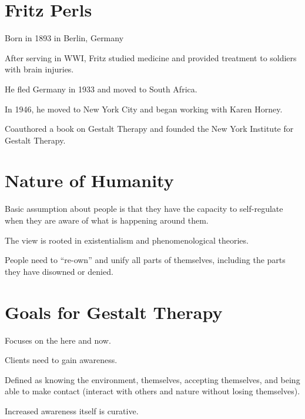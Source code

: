 \section{Fritz Perls}

\begin{coloredlist}
    \item Born in 1893 in Berlin, Germany
    \item After serving in WWI, Fritz studied medicine and provided treatment to soldiers with brain injuries.
    \item He fled Germany in 1933 and moved to South Africa.
    \item In 1946, he moved to New York City and began working with Karen Horney.
    \item Coauthored a book on Gestalt Therapy and founded the New York Institute for Gestalt Therapy.
\end{coloredlist}

\section{Nature of Humanity}

\begin{coloredlist}
    \item Basic assumption about people is that they have the capacity to self-regulate when they are aware of what is happening around them.
    \item The view is rooted in existentialism and phenomenological theories.
    \item People need to ``re-own'' and unify all parts of themselves, including the parts they have disowned or denied.
\end{coloredlist}

\section{Goals for Gestalt Therapy}

\begin{coloredlist}
    \item Focuses on the here and now.
    \item Clients need to gain awareness.
    \begin{coloredlist}
        \item Defined as knowing the environment, themselves, accepting themselves, and being able to make contact (interact with others and nature without losing themselves).
        \item Increased awareness itself is curative.
    \end{coloredlist}
\end{coloredlist}

